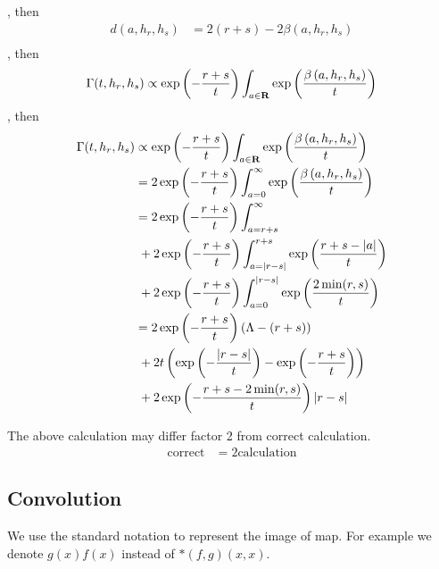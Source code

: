 , then
\begin{equation}\begin{split}
	d(a,h_r,h_s) &= 2(r+s) - 2\beta(a,h_r,h_s) \\
\end{split}\end{equation}
, then
\begin{equation}\begin{split}
	\Gamma(t,h_r,h_s) &\propto \exp\left({-\frac{r+s}{t}}\right)\int_{{a}\in{\mathbf{R}}}\exp\left({\frac{\beta\left({a,h_r,h_s}\right)}{t}}\right) \\
\end{split}\end{equation}
, then
\begin{equation}\begin{split}
	\Gamma(t,h_r,h_s) 
	&\propto \exp\left({-\frac{r+s}{t}}\right)\int_{{a}\in{\mathbf{R}}}\exp\left({\frac{\beta\left({a,h_r,h_s}\right)}{t}}\right) \\
	&= 2\exp\left({-\frac{r+s}{t}}\right)\int_{a=0}^{\infty}\exp\left({\frac{\beta\left({a,h_r,h_s}\right)}{t}}\right) \\
	&= 2\exp\left({-\frac{r+s}{t}}\right) \int_{a=r+s}^\infty \\
		&\;+ 2\exp\left({-\frac{r+s}{t}}\right) \int_{a=\left|{r-s}\right|}^{r+s} \exp\left({\frac{r+s-\left|{a}\right|}{t}}\right) \\
		&\;+ 2\exp\left({-\frac{r+s}{t}}\right) \int_{a=0}^{\left|{r-s}\right|}\exp\left({\frac{2\min(r,s)}{t}}\right) \\
	&= 2\exp\left({-\frac{r+s}{t}}\right)\left({\Lambda - \left({r+s}\right)}\right) \\
		&\;+ 2t\left({\exp\left({-\frac{\left|{r-s}\right|}{t}}\right)-\exp\left({-\frac{r+s}{t}}\right)}\right) \\
		&\;+ 2\exp\left({-\frac{r+s-2\min(r,s)}{t}}\right)\left|{r-s}\right| \\
\end{split}\end{equation}
\begin{todo}
The above calculation may differ factor 2 from correct calculation. 
\begin{equation}\begin{split}
	\text{correct} &= 2\text{calculation}
\end{split}\end{equation}
\end{todo}

\subsection{Convolution}
We use the standard notation to represent the image of map. 
For example we denote $g(x)f(x)$ instead of $*(f,g)(x,x)$.

